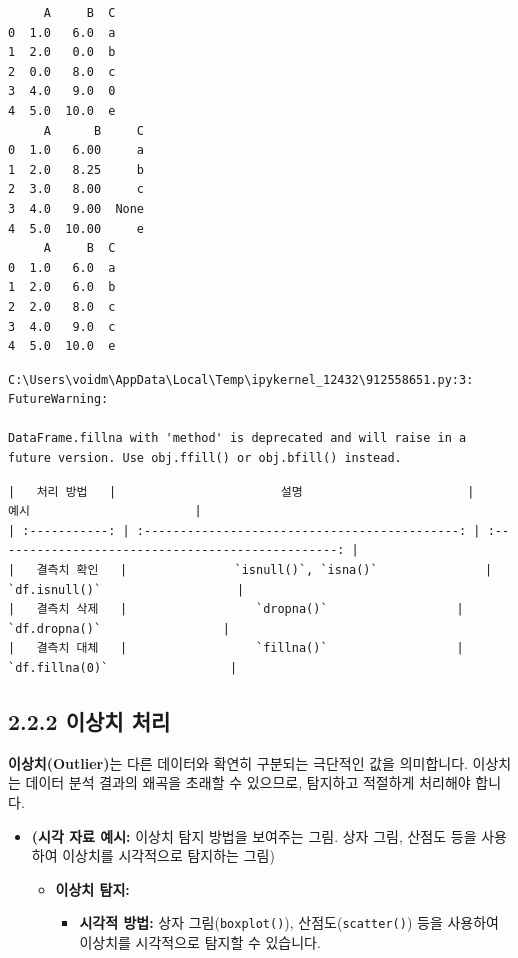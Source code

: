 \documentclass[
  letterpaper,
]{book}
\providecommand{\tightlist}{%
  \setlength{\itemsep}{0pt}\setlength{\parskip}{0pt}}
\begin{document}
\begin{verbatim}
     A     B  C
0  1.0   6.0  a
1  2.0   0.0  b
2  0.0   8.0  c
3  4.0   9.0  0
4  5.0  10.0  e
     A      B     C
0  1.0   6.00     a
1  2.0   8.25     b
2  3.0   8.00     c
3  4.0   9.00  None
4  5.0  10.00     e
     A     B  C
0  1.0   6.0  a
1  2.0   6.0  b
2  2.0   8.0  c
3  4.0   9.0  c
4  5.0  10.0  e
\end{verbatim}

\begin{verbatim}
C:\Users\voidm\AppData\Local\Temp\ipykernel_12432\912558651.py:3: FutureWarning:

DataFrame.fillna with 'method' is deprecated and will raise in a future version. Use obj.ffill() or obj.bfill() instead.
\end{verbatim}

\begin{verbatim}
|   처리 방법   |                       설명                       |                       예시                       |
| :-----------: | :--------------------------------------------: | :------------------------------------------------: |
|   결측치 확인   |               `isnull()`, `isna()`               |                   `df.isnull()`                   |
|   결측치 삭제   |                  `dropna()`                  |                 `df.dropna()`                 |
|   결측치 대체   |                  `fillna()`                  |                 `df.fillna(0)`                 |
\end{verbatim}

\subsection{2.2.2 이상치 처리}\label{uxc774uxc0c1uxce58-uxcc98uxb9ac}

\textbf{이상치(Outlier)}는 다른 데이터와 확연히 구분되는 극단적인 값을
의미합니다. 이상치는 데이터 분석 결과의 왜곡을 초래할 수 있으므로,
탐지하고 적절하게 처리해야 합니다.

\begin{itemize}
\item
  \textbf{(시각 자료 예시:} 이상치 탐지 방법을 보여주는 그림. 상자 그림,
  산점도 등을 사용하여 이상치를 시각적으로 탐지하는 그림)

  \begin{itemize}
  \tightlist
  \item
    \textbf{이상치 탐지:}

    \begin{itemize}
    \tightlist
    \item
      \textbf{시각적 방법:} 상자 그림(\texttt{boxplot()}),
      산점도(\texttt{scatter()}) 등을 사용하여 이상치를 시각적으로
      탐지할 수 있습니다.
    \end{itemize}
  \end{itemize}
\end{itemize}
\end{document}
